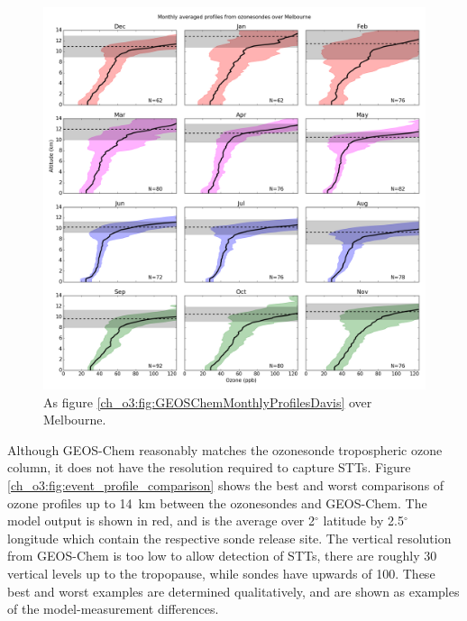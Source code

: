     \begin{figure}[!htbp]
      \includegraphics[width=\textwidth]{Figures/Ozone/Melbourne_sonde_monthprofiles.png}
      \caption{As figure \ref{ch_o3:fig:GEOSChemMonthlyProfilesDavis} over Melbourne.}
      \label{ch_o3:fig:GEOSChemMonthlyProfilesMelbourne}
    \end{figure}
    
    Although GEOS-Chem reasonably matches the ozonesonde tropospheric ozone column, it does not have the resolution required to capture STTs.
    Figure \ref{ch_o3:fig:event_profile_comparison} shows the best and worst comparisons of ozone profiles up to 14~km between the ozonesondes and GEOS-Chem.
    The model output is shown in red, and is the average over 2$^{\circ}$ latitude by 2.5$^{\circ}$ longitude which contain the respective sonde release site.
    The vertical resolution from GEOS-Chem is too low to allow detection of STTs, there are roughly 30 vertical levels up to the tropopause, while sondes have upwards of 100.
    These best and worst examples are determined qualitatively, and are shown as examples of the model-measurement differences.
    
